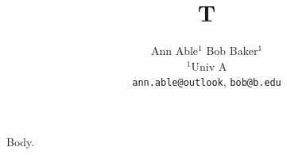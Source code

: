 \documentclass{article}
\begin{document}
\title{T}
\author{Ann Able$^{1}$ \quad Bob Baker$^{1}$ \\
$^{1}$Univ A \\
\texttt{ann.able@outlook}, \texttt{bob@b.edu}}
\maketitle
Body.
\end{document}
